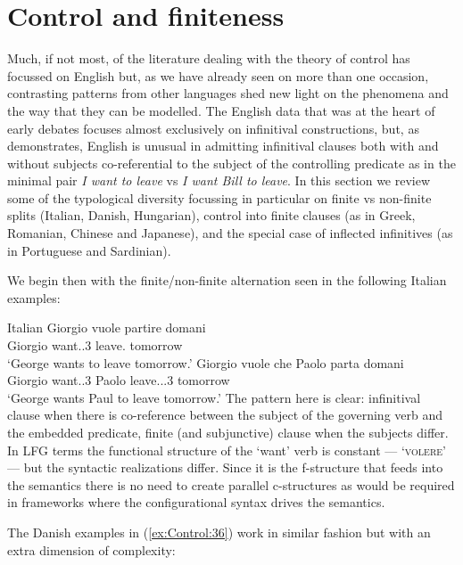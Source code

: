 \documentclass[output=paper,hidelinks]{langscibook}
\begin{document}
\section{Control and finiteness}
\label{sec:Control:6}

Much, if not most, of the literature dealing with the theory of control has focussed on English but, as we have already seen on more than one occasion, contrasting patterns from other languages shed new light on the phenomena and the way that they can be modelled. The English data that was at the heart of early debates focuses almost exclusively on infinitival constructions, but, as \citet{Haspelmath2013} demonstrates, English is unusual in admitting infinitival clauses both with and without subjects co-referential to the subject of the controlling predicate as in the minimal pair \emph{I want to leave} vs \emph{I want Bill to leave}. In this section we review some of the typological diversity focussing in particular on finite vs non-finite splits (Italian, Danish, Hungarian), control into finite clauses (as in Greek, Romanian, Chinese and Japanese), and the special case of inflected infinitives (as in Portuguese and Sardinian).

We begin then with the finite/non-finite alternation seen in the following Italian examples:

\ea\label{ex:Control:35}Italian
\ea\label{ex:Control:35a}\gll Giorgio vuole    partire  domani\\
Giorgio   {want.\PRS.3\SG} {leave.\INF} tomorrow\\
\glt `George wants to leave tomorrow.' 
\ex\label{ex:Control:35b}\gll Giorgio vuole    che Paolo  parta       domani\\
 Giorgio   {want.\PRS.3\SG}   Paolo   {leave.\PRS.\SBJV.3\SG} tomorrow\\
 \glt `George wants Paul to leave tomorrow.'
\z\z
The pattern here is clear: infinitival clause when there is co-reference between the subject of the governing verb and the embedded predicate, finite (and subjunctive) clause when the subjects differ. In LFG terms the functional structure of the `want' verb is constant --- `\textsc{volere}\arglist{\SUBJ,\COMP}' --- but the syntactic realizations differ. Since it is the f-structure that feeds into the semantics there is no need to create parallel c-structures as would be required in frameworks where the configurational syntax drives the semantics.

The Danish examples in (\ref{ex:Control:36}) work in similar fashion but with an extra dimension of complexity:
\end{document}
